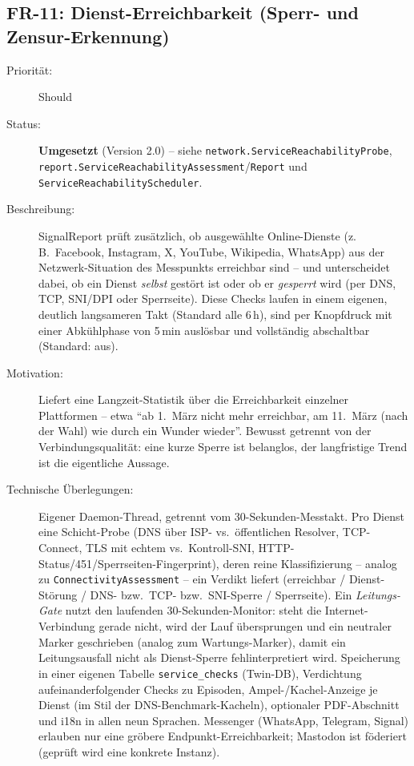 \subsection{FR-11: Dienst-Erreichbarkeit (Sperr- und Zensur-Erkennung)}
\begin{description}
  \item[Priorität:] Should
  \item[Status:] \textbf{Umgesetzt} (Version 2.0) -- siehe \texttt{network.ServiceReachabilityProbe}, \texttt{report.ServiceReachabilityAssessment}/\texttt{Report} und \texttt{ServiceReachabilityScheduler}.
  \item[Beschreibung:] SignalReport prüft zusätzlich, ob ausgewählte Online-Dienste
    (z.\,B.\ Facebook, Instagram, X, YouTube, Wikipedia, WhatsApp) aus der Netzwerk-Situation
    des Messpunkts erreichbar sind -- und unterscheidet dabei, ob ein Dienst \emph{selbst}
    gestört ist oder ob er \emph{gesperrt} wird (per DNS, TCP, SNI/DPI oder Sperrseite).
    Diese Checks laufen in einem eigenen, deutlich langsameren Takt (Standard alle 6\,h),
    sind per Knopfdruck mit einer Abkühlphase von 5\,min auslösbar und vollständig
    abschaltbar (Standard: aus).
  \item[Motivation:] Liefert eine Langzeit-Statistik über die Erreichbarkeit einzelner
    Plattformen -- etwa \enquote{ab 1.\ März nicht mehr erreichbar, am 11.\ März (nach der
    Wahl) wie durch ein Wunder wieder}. Bewusst getrennt von der Verbindungsqualität:
    eine kurze Sperre ist belanglos, der langfristige Trend ist die eigentliche Aussage.
  \item[Technische Überlegungen:] Eigener Daemon-Thread, getrennt vom 30-Sekunden-Messtakt.
    Pro Dienst eine Schicht-Probe (DNS über ISP- vs.\ öffentlichen Resolver, TCP-Connect,
    TLS mit echtem vs.\ Kontroll-SNI, HTTP-Status/451/Sperrseiten-Fingerprint), deren reine
    Klassifizierung -- analog zu \texttt{ConnectivityAssessment} -- ein Verdikt liefert
    (erreichbar / Dienst-Störung / DNS- bzw.\ TCP- bzw.\ SNI-Sperre / Sperrseite).
    Ein \emph{Leitungs-Gate} nutzt den laufenden 30-Sekunden-Monitor: steht die
    Internet-Verbindung gerade nicht, wird der Lauf übersprungen und ein neutraler Marker
    geschrieben (analog zum Wartungs-Marker), damit ein Leitungsausfall nicht als
    Dienst-Sperre fehlinterpretiert wird. Speicherung in einer eigenen Tabelle
    \texttt{service\_checks} (Twin-DB), Verdichtung aufeinanderfolgender Checks zu Episoden,
    Ampel-/Kachel-Anzeige je Dienst (im Stil der DNS-Benchmark-Kacheln), optionaler
    PDF-Abschnitt und i18n in allen neun Sprachen. Messenger (WhatsApp, Telegram, Signal)
    erlauben nur eine gröbere Endpunkt-Erreichbarkeit; Mastodon ist föderiert (geprüft wird
    eine konkrete Instanz).
\end{description}

